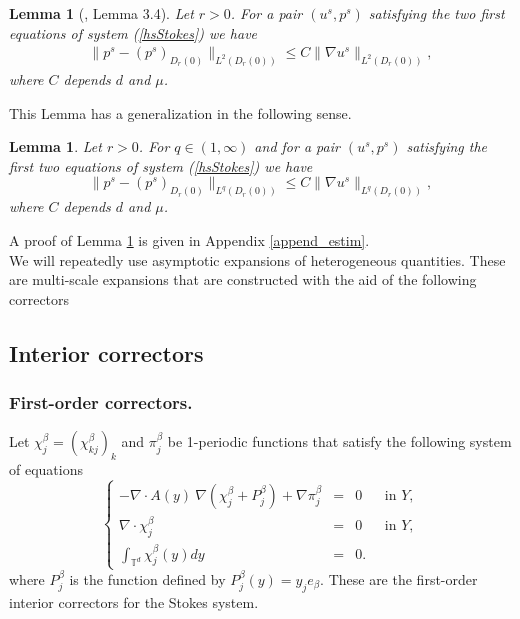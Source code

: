 \documentclass[11pt, reqno]{amsart}
\newtheorem{lemma}[theorem]{Lemma}
\theoremstyle{definition}
\theoremstyle{remark}
\numberwithin{equation}{section}
\begin{document}
\begin{lemma} [\cite{choi}, Lemma 3.4]
	Let $r>0$. For a pair $(u^s,p^s)$ satisfying the two first equations of system \textup{(\ref{hsStokes})} we have \begin{align}
		\|p^s-(p^s)_{D_r(0)} \|_{L^2(D_r(0))}\leq C \|\nabla u^s \|_{L^2(D_r(0))},\label{estim_Bogov}
	\end{align}
		where $C$ depends $d$ and $\mu$.
\end{lemma}
\noindent This Lemma has a generalization in the following sense.
\begin{lemma} \label{Bogov_p}
	Let $r>0$. For $q\in(1,\infty)$ and for a pair $(u^s,p^s)$ satisfying the first two equations of system \textup{(\ref{hsStokes})} we have \begin{equation}
		\|p^s-(p^s)_{D_r(0)} \|_{L^q(D_r(0))}\leq C \|\nabla u^s \|_{L^q(D_r(0))}, \label{estim_Bogov_p}\nonumber
	\end{equation}
	where $C$ depends $d$ and $\mu$.
\end{lemma}
\noindent A proof of Lemma \ref{Bogov_p} is given in Appendix \ref{append_estim}.\\



	
	\noindent We will repeatedly use asymptotic expansions of heterogeneous quantities. These are multi-scale expansions that are constructed with the aid of the following correctors
	\subsection{Interior correctors}\label{ansatz}
	\subsubsection{First-order correctors.}
	Let $\chi^{\beta}_{j}=(\chi^{\beta}_{kj})_k$ and   $\pi^{\beta}_{j}$ be 1-periodic functions that satisfy the following system of equations
	\begin{equation}\label{chipi}
		\left\{
		\begin{array}{rcl}
			-\nabla\cdot A(y) \: \nabla (\chi^{\beta}_{j}+ P^{\beta}_{j} ) +  \nabla \pi^{\beta}_{j} &=& 0  \;  \quad \mbox{ in } Y,\\
			\nabla\cdot \chi^{\beta}_{j} &=& 0 \;  \quad   \mbox{ in } Y,\\
			\int_{\mathbb{T}^d} \chi^{\beta}_{j}(y) dy&=& 0.
		\end{array}
		\right. 
	\end{equation}
	where $ P^{\beta}_{j}$ is the function defined by $ P^{\beta}_{j}(y)=y_j e_\beta$. These are the first-order interior correctors for the Stokes system. \\
\end{document}

